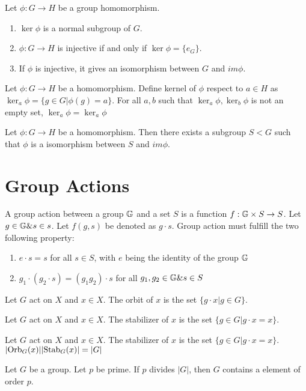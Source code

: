 \documentclass[../note.tex]{subfiles}
\begin{document}
\begin{theorem}
	Let $\phi : G \rightarrow H$ be a group homomorphism.
\begin{enumerate}
	\item $\ker{\phi}$ is a normal subgroup of $G$. 
	\item $\phi: G \rightarrow H$ is injective if and only if $\ker{\phi} = \{e_{G}\}$.
	\item If $\phi$ is injective, it gives an isomorphism between $G$ and $im{\phi}$.
\end{enumerate}
\end{theorem}

\begin{hypothesis}
	Let $\phi: G \rightarrow H$ be a homomorphism.
	Define kernel of $\phi$ respect to $a \in H$ as $\ker_a{\phi}=\{g\in G| \phi(g)=a\}$.
	For all $a, b$ such that $\ker_a{\phi}, \ker_b{\phi}$ is not an empty set, $\ker_a{\phi}=\ker_a{\phi}$ 
\end{hypothesis}

\begin{hypothesis}
	Let $\phi: G \rightarrow H$ be a homomorphism. Then there exists a subgroup $S < G$ such that $\phi$ is a isomorphism between $S$ and $im \phi$.
\end{hypothesis}

\section{Group Actions}
\begin{definition}
	A group action between a group $\mathbb{G}$ and a set $S$ is a function $f: \mathbb{G}\times S \rightarrow S$. 
	Let $g\in \mathbb{G} \& s \in s$. Let $f(g,s)$ be denoted as $g\cdot s$. Group action must fulfill the two following property:
	\begin{enumerate}
		\item $e\cdot s=s$ for all $s\in S$, with $e$ being the identity of the group $\mathbb{G}$
		\item $g_1\cdot(g_2 \cdot s) = (g_1 g_2) \cdot s$ for all $g_1, g_2 \in \mathbb{G} \& s \in S$
	\end{enumerate}
\end{definition}
\begin{definition}[Orbit]
	Let $G$ act on $X$ and $x \in X$. The orbit of $x$ is the set $\{g\cdot x | g \in G\}$.	
\end{definition}

\begin{definition}[Stabilizer]
	Let $G$ act on $X$ and $x \in X$. The stabilizer of $x$ is the set $\{g \in G | g\cdot x = x\}$.
\end{definition}

\begin{theorem}
	Let $G$ act on $X$ and $x \in X$. The stabilizer of $x$ is the set $\{g \in G | g\cdot x = x\}$.
	$|\text{Orb}_{G}({x})||\text{Stab}_{G}({x})|=|G|$
\end{theorem}

\begin{theorem}
	Let $G$ be a group. Let $p$ be prime. If $p$ divides $|G|$, then $G$ contains a element of order $p$.
\end{theorem}
\end{document}
